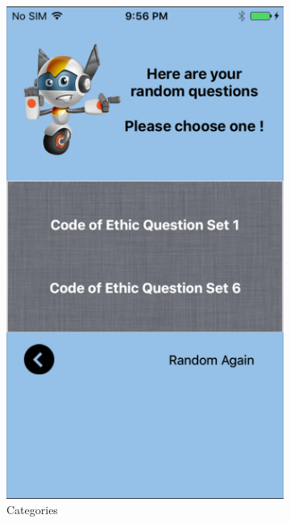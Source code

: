 \begin{figure}[!hbt]
\begin{subfigure}{0.27\textwidth}
\includegraphics[width=\textwidth]{game2}
\caption{Categories}
 \end{subfigure}\hspace{0.03\textwidth}
 \begin{subfigure}{0.27\textwidth}

\end{subfigure}
\end{figure}
